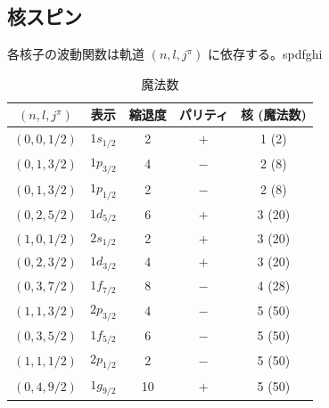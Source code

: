\documentclass[uplatex,dvipdfmx,a4paper,11pt]{jlreq}
\numberwithin{equation}{section}
\theoremstyle{definition}
\begin{document}
\subsection{核スピン}
各核子の波動関数は軌道 $(n, l, j^\pi)$ に依存する。spdfghi
\begin{table}[hbtp]
  \centering
  \begin{tabular}{|c|c|c|c|c|}
    \hline
    $(n, l, j^\pi)$ & 表示         & 縮退度 & パリティ & 核 (魔法数) \\
    \hline \hline
    $(0, 0, 1/2)$   & $1s_{1/2}$ & 2   & $+$  & 1 (2)   \\
    $(0, 1, 3/2)$   & $1p_{3/2}$ & 4   & $-$  & 2 (8)   \\
    $(0, 1, 3/2)$   & $1p_{1/2}$ & 2   & $-$  & 2 (8)   \\
    $(0, 2, 5/2)$   & $1d_{5/2}$ & 6   & $+$  & 3 (20)  \\
    $(1, 0, 1/2)$   & $2s_{1/2}$ & 2   & $+$  & 3 (20)  \\
    $(0, 2, 3/2)$   & $1d_{3/2}$ & 4   & $+$  & 3 (20)  \\
    $(0, 3, 7/2)$   & $1f_{7/2}$ & 8   & $-$  & 4 (28)  \\
    $(1, 1, 3/2)$   & $2p_{3/2}$ & 4   & $-$  & 5 (50)  \\
    $(0, 3, 5/2)$   & $1f_{5/2}$ & 6   & $-$  & 5 (50)  \\
    $(1, 1, 1/2)$   & $2p_{1/2}$ & 2   & $-$  & 5 (50)  \\
    $(0, 4, 9/2)$   & $1g_{9/2}$ & 10  & $+$  & 5 (50)  \\
    \hline
  \end{tabular}
  \caption{魔法数}
  \label{table:magic number}
\end{table}
\end{document}
